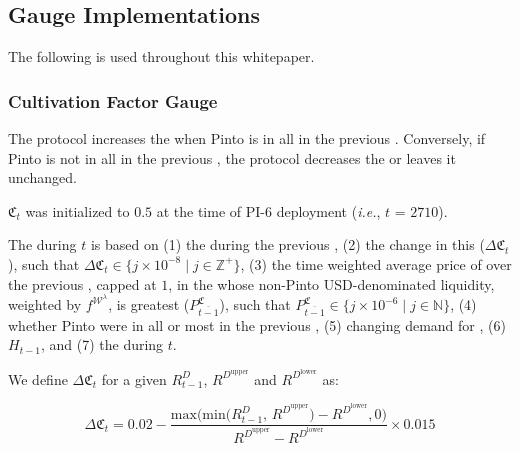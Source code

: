 \documentclass[class=article, crop=false]{standalone}
\begin{document}
\begingroup
\setlength{\parskip}{0.85em}


\subsection{Gauge Implementations}

The following  is used throughout this whitepaper.


\subsubsection{Cultivation Factor Gauge}\label{sec:cultivation-factor}

The protocol increases the  when Pinto is  in all  in the previous . Conversely, if Pinto is not  in all  in the previous , the protocol decreases the  or leaves it unchanged.

$\mathfrak{C}_{t}$ was initialized to $0.5$ at the time of PI-6 deployment (\textit{i.e.}, $t$ = $2710$).

The  during $t$ is based on (1) the  during the previous , (2) the change in  this  ($\Delta \mathfrak{C}_{t}$), such that $\Delta \mathfrak{C}_{t} \in \{j \times 10^{-8} \mid j \in \mathbb{Z}^{+} \}$, (3) the time weighted average price of  over the previous , capped at $1$, in the  whose non-Pinto USD-denominated liquidity, weighted by $f^{\mathscr{W}^{\lambda}}$, is greatest ($P_{\overline{t-1}}^{\mathfrak{C}}$), such that $P_{\overline{t-1}}^{\mathfrak{C}} \in \{j \times 10^{-6} \mid j \in \mathbb{N} \}$, (4) whether Pinto were  in all or most  in the previous , (5) changing demand for , (6) $H_{t-1}$, and (7) the  during $t$.

\begin{keepunit}
We define $\Delta \mathfrak{C}_{t}$ for a given $R_{t-1}^{D}$, $R^{D^{\text{upper}}}$ and $R^{D^{\text{lower}}}$ as:

    $$
        \Delta \mathfrak{C}_{t} =
            0.02 - \frac{\text{max(min($R_{t-1}^{D}$, $R^{D^{\text{upper}}}$)} - \text{$R^{D^{\text{lower}}}$}, 0)} {\text{$R^{D^{\text{upper}}}$} - \text{$R^{D^{\text{lower}}}$}} \times 0.015
    $$
\end{keepunit}
\end{document}
